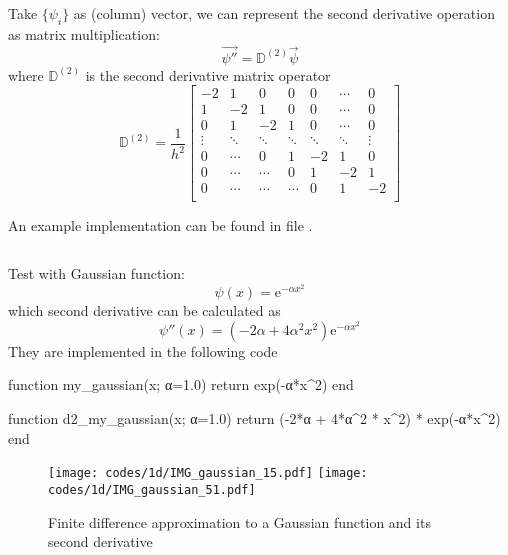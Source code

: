 Take $\{ \psi_{i} \}$ as (column) vector, we can represent the second derivative operation
as matrix multiplication:
\begin{equation}
\vec{\psi''} = \mathbb{D}^{(2)} \vec{\psi}
\end{equation}
where $\mathbb{D}^{(2)}$ is the second derivative matrix operator
\begin{equation}
\mathbb{D}^{(2)} = \frac{1}{h^2}
\begin{bmatrix}
-2  &  1  &  0  &  0  & 0 & \cdots & 0 \\
 1  & -2  &  1  &  0  & 0 & \cdots & 0 \\
 0  &  1  & -2  &  1  & 0 & \cdots & 0 \\
 \vdots  &  \ddots  &  \ddots  & \ddots  & \ddots  & \ddots & \vdots \\
 0 & \cdots & 0 & 1 & -2 & 1 & 0 \\
 0  &  \cdots  & \cdots & 0  & 1  & -2  & 1 \\
 0  &  \cdots  & \cdots & \cdots & 0  &  1  & -2 \\
\end{bmatrix}
\end{equation}

An example implementation can be found in file .

\inputminted[breaklines,fontsize=\scriptsize]{julia}{codes/1d/build_D2_matrix_3pt.jl}

Test with Gaussian function:
\begin{equation}
\psi(x) = \mathrm{e}^{-\alpha x^2}
\end{equation}
%
which second derivative can be calculated as
%
\begin{equation}
\psi''(x) = \left( -2 \alpha + 4\alpha^2 x^2 \right) \mathrm{e}^{-\alpha x^2}
\end{equation}
%
They are implemented in the following code
\begin{juliacode}
function my_gaussian(x; α=1.0)
    return exp(-α*x^2)
end

function d2_my_gaussian(x; α=1.0)
    return (-2*α + 4*α^2 * x^2) * exp(-α*x^2)
end
\end{juliacode}

\begin{figure}[H]
{\center
\texttt{[image: codes/1d/IMG\_gaussian\_15.pdf]}
\texttt{[image: codes/1d/IMG\_gaussian\_51.pdf]}
\par}
\caption{Finite difference approximation to a Gaussian function and its second derivative}
\end{figure}


